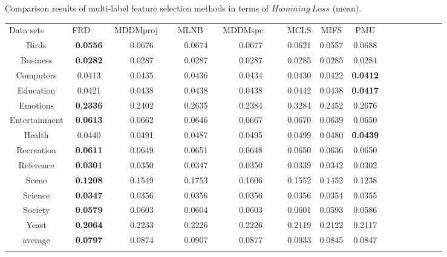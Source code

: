 \documentclass[final,3p,times]{elsarticle}
\begin{document}
\begin{table5-1*}
\begin{center}
\caption{Comparison results of multi-label feature selection methods in terms of $Hamming ~ Loss$ (mean).}
\label{tab:1}
\begin{tabular}{ccccccccccccccc}
\hline\noalign{\smallskip}
Data sets    ~~~~& FRD ~~~& MDDMproj ~~& MLNB  ~~& MDDMspc ~~~& MCLS & MIFS & PMU \\
\noalign{\smallskip}\hline\noalign{\smallskip}
Birds &	    \textbf{0.0556 } &  0.0676  &  0.0674  &  0.0677  &  0.0621  &  0.0557   &  0.0688\\

Business &    \textbf{0.0282}  &  0.0287  &  0.0287  &  0.0287  &  0.0285  &  0.0285  &  0.0284  \\

Computers &     0.0413 &   0.0435 &   0.0436  &  0.0434 &   0.0430  &  0.0422  &  \textbf{0.0412} \\

Education &	    0.0421 &   0.0438 &   0.0438  &  0.0438 &   0.0442 &   0.0438 &   \textbf{0.0417}  \\

Emotions &	   \textbf{0.2336}  &  0.2402  &  0.2635  &  0.2384  &  0.3284 &   0.2452  &  0.2676   \\

Entertainment &     \textbf{0.0613}  &  0.0662  &  0.0646  &  0.0667  &  0.0670  &  0.0639  &  0.0650   \\

Health  &   0.0440   & 0.0491  &  0.0487  &  0.0495  &  0.0499   & 0.0480  &  \textbf{0.0439}  \\

Recreation & \textbf{0.0611}  &  0.0649  &  0.0651  &  0.0648  &  0.0650  &  0.0636  &  0.0650  \\

Reference &	   \textbf{0.0301}  &  0.0350  &  0.0347  &  0.0350  &  0.0339  &  0.0342  &  0.0302   \\

Scene &    \textbf{0.1208}  &  0.1549  &  0.1753  &  0.1606  &  0.1552  &  0.1452 &   0.1238  \\

Science &    \textbf{0.0347}  &  0.0356  &  0.0356  &  0.0356 &   0.0356  &  0.0354  &  0.0355   \\

Society &   \textbf{0.0579}  &  0.0603  &  0.0604  &  0.0603 &   0.0601  &  0.0593  &  0.0586   \\

Yeast &   \textbf{0.2064}  &  0.2233  &  0.2226  &  0.2226  &  0.2119  &  0.2122  &  0.2117   \\

average &  \textbf{0.0797}  &  0.0874  &  0.0907  &  0.0877 &   0.0933  &  0.0845  &  0.0847  \\
\noalign{\smallskip}\hline
\end{tabular}
\end{center}
\end{table5-1*}
\end{document}
